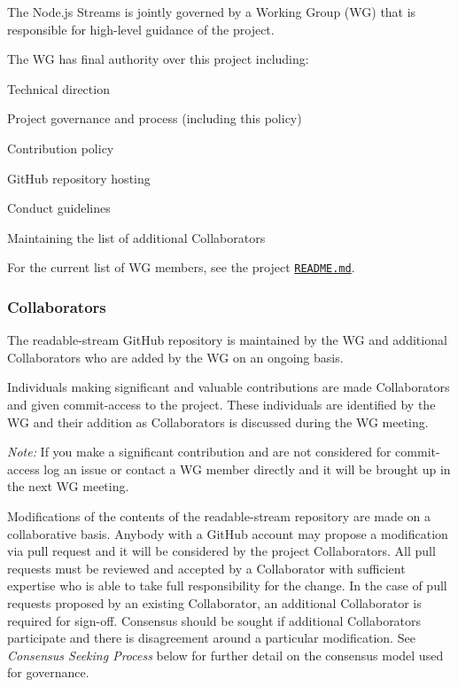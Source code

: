 The Node.\+js Streams is jointly governed by a Working Group (WG) that is responsible for high-\/level guidance of the project.

The WG has final authority over this project including\+:


\begin{DoxyItemize}
\item Technical direction
\item Project governance and process (including this policy)
\item Contribution policy
\item Git\+Hub repository hosting
\item Conduct guidelines
\item Maintaining the list of additional Collaborators
\end{DoxyItemize}

For the current list of WG members, see the project \href{./README.md#current-project-team-members}{\tt R\+E\+A\+D\+M\+E.\+md}.

\subsubsection*{Collaborators}

The readable-\/stream Git\+Hub repository is maintained by the WG and additional Collaborators who are added by the WG on an ongoing basis.

Individuals making significant and valuable contributions are made Collaborators and given commit-\/access to the project. These individuals are identified by the WG and their addition as Collaborators is discussed during the WG meeting.

{\itshape Note\+:} If you make a significant contribution and are not considered for commit-\/access log an issue or contact a WG member directly and it will be brought up in the next WG meeting.

Modifications of the contents of the readable-\/stream repository are made on a collaborative basis. Anybody with a Git\+Hub account may propose a modification via pull request and it will be considered by the project Collaborators. All pull requests must be reviewed and accepted by a Collaborator with sufficient expertise who is able to take full responsibility for the change. In the case of pull requests proposed by an existing Collaborator, an additional Collaborator is required for sign-\/off. Consensus should be sought if additional Collaborators participate and there is disagreement around a particular modification. See {\itshape Consensus Seeking Process} below for further detail on the consensus model used for governance.

